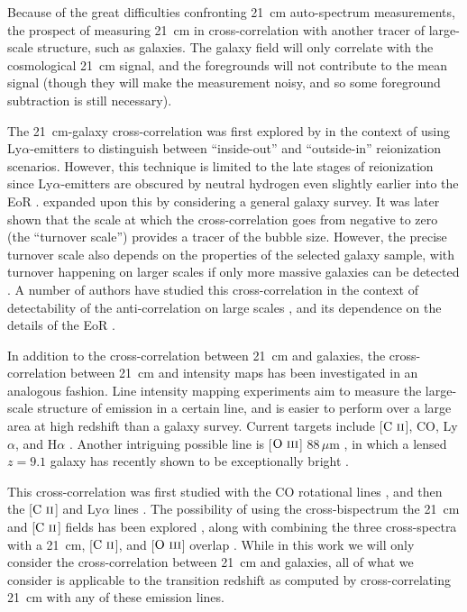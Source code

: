 \documentclass[a4paper,fleqn,usenatbib]{mnras}
\newcommand{\CII}{\ensuremath{\text{C~\textsc{ii}}}}
\newcommand{\OIII}{\ensuremath{\text{O~\textsc{iii}}}}
\begin{document}
Because of the great difficulties confronting 21~cm auto-spectrum
measurements, the prospect of measuring 21~cm in cross-correlation with
another tracer of large-scale structure, such as galaxies. The galaxy field
will only correlate with the cosmological 21~cm signal, and the foregrounds
will not contribute to the mean signal (though they will make the measurement
noisy, and so some foreground subtraction is still necessary).

The 21~cm-galaxy cross-correlation was first explored by
\citet{2007MNRAS.375.1034W} in the context of using Ly$\alpha$-emitters to
distinguish between ``inside-out'' and ``outside-in'' reionization scenarios.
However, this technique is limited to the late stages of reionization since
Ly$\alpha$-emitters are obscured by neutral hydrogen even slightly earlier
into the EoR \citep[e.g.][]{2006ApJ...648....7K}. \citet{2007ApJ...660.1030F}
expanded upon this by considering a general galaxy survey. It was later shown
that the scale at which the cross-correlation goes from negative to zero (the
``turnover scale'') provides a tracer of the bubble size. However, the precise
turnover scale also depends on the properties of the selected galaxy sample,
with turnover happening on larger scales if only more massive galaxies can be
detected \citep{2009ApJ...690..252L}. A number of authors have studied this
cross-correlation in the context of detectability of the anti-correlation on
large scales \citep{2013MNRAS.432.2615W, 2016MNRAS.457..666V,
2017ApJ...836..176H}, and its dependence on the details of the EoR
\citep{2014MNRAS.438.2474P}.

In addition to the cross-correlation between 21~cm and galaxies, the
cross-correlation between 21~cm and intensity maps has been investigated in an
analogous fashion. Line intensity mapping experiments aim to measure the
large-scale structure of emission in a certain line, and is easier to perform
over a large area at high redshift than a galaxy survey. Current targets
include [\CII], CO, Ly$\alpha$, and H$\alpha$ \citep[for a recent review,
see][]{2017arXiv170909066K}. Another intriguing possible line is [\OIII]
$88\,\mu \text{m}$ \citep[e.g.][]{2018MNRAS.481L..84M}, in which a lensed
$z=9.1$ galaxy has recently shown to be exceptionally bright
\citep{2018Natur.557..392H}.

This cross-correlation was first studied with the CO rotational lines
\citep{2011ApJ...741...70L}, and then the [\CII] \citep{2012ApJ...745...49G}
and Ly$\alpha$ lines \citep{2013ApJ...763..132S}. The possibility of using the
cross-bispectrum the 21~cm and [\CII] fields has been explored
\citep{2018ApJ...867...26B}, along with combining the three cross-spectra with
a 21~cm, [\CII], and [\OIII] overlap \citep{2019ApJ...874..133B}. While in
this work we will only consider the cross-correlation between 21~cm and
galaxies, all of what we consider is applicable to the transition redshift as
computed by cross-correlating 21~cm with any of these emission lines.
\end{document}
